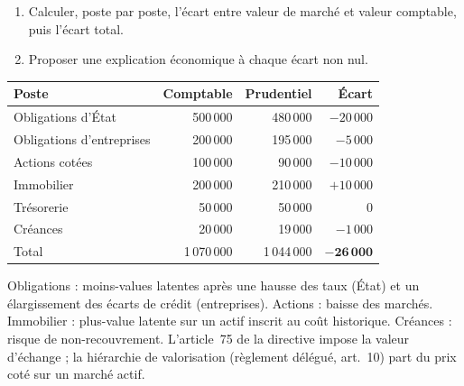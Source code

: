 \documentclass[11pt,a4paper]{article}
\begin{document}
\begin{exercice}
\begin{enumerate}[nosep]
  \item Calculer, poste par poste, l'écart entre valeur de marché et valeur comptable, puis l'écart total.
  \item Proposer une explication économique à chaque écart non nul.
\end{enumerate}
\end{exercice}
\begin{corrige}
\begin{center}
\begin{tabular}{lrrr}
\toprule
Poste & Comptable & Prudentiel & Écart \\
\midrule
Obligations d'État        & 500\,000 & 480\,000 & $-20\,000$ \\
Obligations d'entreprises & 200\,000 & 195\,000 & $-5\,000$ \\
Actions cotées            & 100\,000 &  90\,000 & $-10\,000$ \\
Immobilier                & 200\,000 & 210\,000 & $+10\,000$ \\
Trésorerie                &  50\,000 &  50\,000 & 0 \\
Créances                  &  20\,000 &  19\,000 & $-1\,000$ \\
\midrule
Total                     & 1\,070\,000 & 1\,044\,000 & $\mathbf{-26\,000}$ \\
\bottomrule
\end{tabular}
\end{center}
Obligations : moins-values latentes après une hausse des taux (État) et un élargissement des
écarts de crédit (entreprises). Actions : baisse des marchés. Immobilier : plus-value latente sur
un actif inscrit au coût historique. Créances : risque de non-recouvrement. L'article~75 de la
directive impose la valeur d'échange ; la hiérarchie de valorisation (règlement délégué, art.~10)
part du prix coté sur un marché actif.
\end{corrige}
\end{document}
